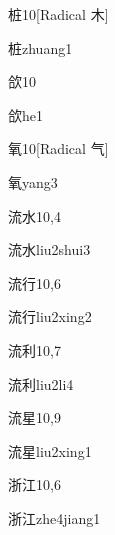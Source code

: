 \begin{entry}{桩}{10}[Radical 木]
  \begin{phonetics}{桩}{zhuang1}
  \end{phonetics}
\end{entry}

\begin{entry}{欱}{10}
  \begin{phonetics}{欱}{he1}
  \end{phonetics}
\end{entry}

\begin{entry}{氧}{10}[Radical 气]
  \begin{phonetics}{氧}{yang3}
  \end{phonetics}
\end{entry}

\begin{entry}{流水}{10,4}
  \begin{phonetics}{流水}{liu2shui3}
  \end{phonetics}
\end{entry}

\begin{entry}{流行}{10,6}
  \begin{phonetics}{流行}{liu2xing2}
  \end{phonetics}
\end{entry}

\begin{entry}{流利}{10,7}
  \begin{phonetics}{流利}{liu2li4}
  \end{phonetics}
\end{entry}

\begin{entry}{流星}{10,9}
  \begin{phonetics}{流星}{liu2xing1}
  \end{phonetics}
\end{entry}

\begin{entry}{浙江}{10,6}
  \begin{phonetics}{浙江}{zhe4jiang1}
  \end{phonetics}
\end{entry}

